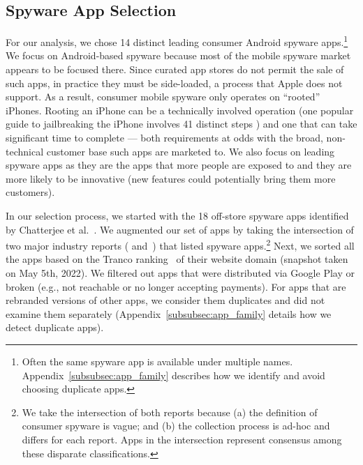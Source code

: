\documentclass[sigconf,balance=false]{acmart}
\begin{document}
\subsection{Spyware App Selection}
\label{subsec:app_selection}



For our analysis, we chose 14 distinct leading consumer Android spyware
apps.\footnote{Often the same spyware app is available under multiple
  names.  Appendix~\ref{subsubsec:app_family} describes how we
  identify and avoid choosing duplicate apps.}  We focus on
Android-based spyware because most of the mobile spyware market
appears to be focused there. Since curated app stores do not permit
the sale of such apps, in practice they must be side-loaded, a process
that Apple does not support.  As a result, consumer mobile spyware only operates on ``rooted'' iPhones.  Rooting an iPhone can be a
technically involved operation (one popular guide to jailbreaking the
iPhone involves 41 distinct steps \cite{howToJailbreakIphone:online}) and one that can take significant
time to complete --- both requirements at odds with the broad,
non-technical customer base such apps are marketed to. We also focus on leading spyware apps as they are the apps that more people are exposed to and they are more likely to be innovative (new features could potentially bring them more customers).

In our selection process, we started with the 18 off-store spyware apps identified by Chatterjee et al.~\cite{chatterjee2018spyware}. We augmented our set of apps by taking the intersection of two major industry reports (\cite{esetandr4:online} and~\cite{Tekstalk86:online}) that listed spyware apps.\footnote{We take the intersection of both reports because (a) the definition of consumer spyware is vague; and (b) the collection process is ad-hoc and differs for each report. Apps in the intersection represent consensus among these disparate classifications.} Next, we sorted all the apps based on the Tranco ranking~\cite{pochat2018tranco} of their website domain (snapshot taken on May 5th, 2022).  We filtered out apps that were distributed via Google Play or broken (e.g., not reachable or no longer accepting payments). For apps that are rebranded versions of other apps, we consider them duplicates and did not examine them separately (Appendix~\ref{subsubsec:app_family} details how we detect duplicate apps).
\end{document}

